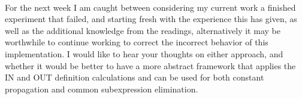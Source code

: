 \documentclass[14pt]{article}
\begin{document}
\paragraph{}
For the next week I am caught between considering my current work a finished experiment that failed, and starting fresh with the experience this has given, as well as the additional knowledge from the readings, alternatively it may be worthwhile to continue working to correct the incorrect behavior of this implementation. I would like to hear your thoughts on either approach, and whether it would be better to have a more abstract framework that applies the IN and OUT definition calculations and can be used for both constant propagation and common subexpression elimination.
\end{document}
